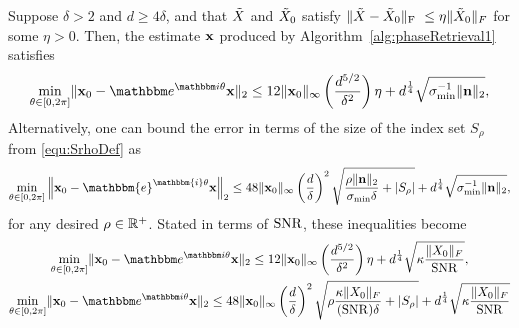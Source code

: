 \begin{theorem}\label{thm:MainRes}
Suppose $\delta > 2$ and $d \ge 4 \delta$, and that $\tilde{X}$ and $\tilde{X}_0$ satisfy $\Vert \tilde{X} - \tilde{X}_0 \Vert_{\rm F}~\leq \eta \Vert \tilde{X}_0 \Vert_F$ for some $\eta>0$.  Then, the estimate $\mathbf x$ produced by Algorithm~\ref{alg:phaseRetrieval1} satisfies 
\[ \mintheta \norm{\x_0 - \eit \x}_2 \leq 12 \norm{\x_0}_{\infty} \left( \frac{d^{5/2}}{\delta^2} \right) \eta  + d^{\frac{1}{4}} \sqrt{\sigma_{\min}^{-1} \| \n \|_2 },\]
Alternatively, one can bound the error in terms of the size of the index set $S_\rho$ from \eqref{equ:SrhoDef} as
        \begin{equation}
\min_{\theta \in [0, 2 \pi]} \left\Vert  \x_0 - \mathbbm{e}^{\mathbbm{i} \theta} \x \right\Vert_2 \leq 48 \Vert \x_0 
        \Vert_{\infty} \left( \frac{d}{\delta} \right)^2 \sqrt{ \frac{\rho \norm{\n}_2}{\sigma_{\min}\delta} + \left| S_\rho \right|} + d^{\frac{1}{4}} \sqrt{\sigma_{\min}^{-1} \| \n \|_2 }, \label{equ:ManRes2} 
\end{equation}
for any desired $\rho \in \mathbb{R}^+$.  Stated in terms of $\operatorname{SNR}$, these inequalities become
\begin{equation}
  \begin{gathered}
    \mintheta \norm{\x_0 - \eit \x}_2 \leq 12 \norm{\x_0}_{\infty} \left(\frac{d^{5/2}}{\delta^2}\right) \eta  + d^{\frac{1}{4}} \sqrt{\kappa \frac{\norm{X_0}_F}{\SNR} }, \\
    \mintheta \norm{\x_0 - \eit \x}_2 \leq 48 \norm{\x_0}_{\infty} \left( \frac{d}{\delta} \right)^2 \sqrt{\rho \frac{\kappa \norm{X_0}_F}{(\SNR) \delta} + \left| S_\rho \right|} + d^{\frac{1}{4}} \sqrt{\kappa \frac{\norm{X_0}_F}{\SNR}}
  \end{gathered}
  \label{eq:mainres2_SNR}
\end{equation}
\end{theorem}

